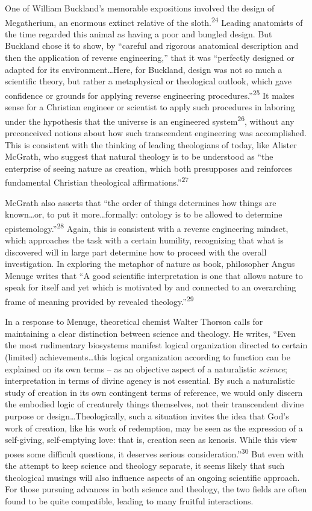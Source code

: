 One of William Buckland’s memorable expositions involved the design of
Megatherium, an enormous extinct relative of the
sloth.\textsuperscript{24} Leading anatomists of the time regarded this
animal as having a poor and bungled design. But Buckland chose it to
show, by “careful and rigorous anatomical description and then the
application of reverse engineering,” that it was “perfectly designed or
adapted for its environment…Here, for Buckland, design was not so much
a scientific theory, but rather a metaphysical or theological outlook,
which gave confidence or grounds for applying reverse engineering
procedures.”\textsuperscript{25} It makes sense for a Christian
engineer or scientist to apply such procedures in laboring under the
hypothesis that the universe is an engineered
system\textsuperscript{26}, without any preconceived notions about how
such transcendent engineering was accomplished. This is consistent with
the thinking of leading theologians of today, like Alister McGrath, who
suggest that natural theology is to be understood as “the enterprise of
seeing nature as creation, which both presupposes and reinforces
fundamental Christian theological affirmations.”\textsuperscript{27}


McGrath also asserts that “the order of things determines how things are
known…or, to put it more…formally: ontology is to be allowed to
determine epistemology.”\textsuperscript{28} Again, this is consistent
with a reverse engineering mindset, which approaches the task with a
certain humility, recognizing that what is discovered will in large
part determine how to proceed with the overall investigation. In
exploring the metaphor of nature as book, philosopher Angus Menuge
writes that “A good scientific interpretation is one that allows nature
to speak for itself and yet which is motivated by and connected to an
overarching frame of meaning provided by revealed
theology.”\textsuperscript{29}


In a response to Menuge, theoretical chemist Walter Thorson calls for
maintaining a clear distinction between science and theology. He
writes, “Even the most rudimentary biosystems manifest logical
organization directed to certain (limited) achievements…this logical
organization according to function can be explained on its own terms –
as an objective aspect of a naturalistic \textit{science};
interpretation in terms of divine agency is not essential. By such a
naturalistic study of creation in its own contingent terms of
reference, we would only discern the embodied logic of creaturely
things themselves, not their transcendent divine purpose or
design…Theologically, such a situation invites the idea that God’s work
of creation, like his work of redemption, may be seen as the expression
of a self-giving, self-emptying love: that is, creation seen as
kenosis. While this view poses some difficult questions, it deserves
serious consideration.”\textsuperscript{30} But even with the attempt
to keep science and theology separate, it seems likely that such
theological musings will also influence aspects of an ongoing
scientific approach. For those pursuing advances in both science and
theology, the two fields are often found to be quite compatible,
leading to many fruitful interactions.


